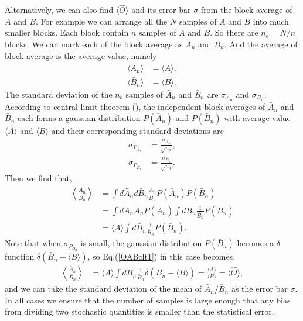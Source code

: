 \documentclass[12pt,letterpaper,UTF8]{report}
\begin{document}
Alternatively, we can also find $\langle \hat{O} \rangle$ and its error bar $\sigma$ from the block average of $A$ and $B$.
For example we can arrange all the $N$ samples of $A$ and $B$ into much smaller blocks. Each block contain $n$ samples of $A$ and $B$. So there are $n_b=N/n$ blocks. We can mark each of the block average as $\bar{A}_n$ and $\bar{B}_n$.
And the average of block average is the average value, namely
\begin{align}
\langle \bar{A}_n \rangle &= \langle A \rangle, \\
\langle \bar{B}_n \rangle &= \langle B \rangle.
\end{align}
The standard deviation of the $n_b$ samples of $\bar{A}_n$ and $\bar{B}_n$ are $\sigma_{A_n}$ and $\sigma_{B_n}$.
According to central limit theorem (\cite{Negele1998Quantum,VesaPDF}), the independent block averages of $\bar{A}_n$ and $\bar{B}_n$ each forms a gaussian distribution $P(\bar{A}_n)$ and $P(\bar{B}_n)$ with average value $\langle A \rangle$ and $\langle B \rangle$ and their corresponding standard deviations are
\begin{align}
\sigma_{P_{\bar{A}_n}} &= \frac{\sigma_{\bar{A}_n}}{\sqrt{n_b}}, \\
\sigma_{P_{\bar{B}_n}} &= \frac{\sigma_{\bar{B}_n}}{\sqrt{n_b}}.
\end{align}
Then we find that,
\begin{align}
\left\langle\frac{\bar{A}_n}{ \bar{B}_n }\right\rangle &=
\int d \bar{A}_n d \bar{B}_n \frac{\bar{A}_n}{\bar{B}_n}
P(\bar{A}_n) P(\bar{B}_n) \nonumber \\
&=
\int d \bar{A}_n \bar{A}_n P(\bar{A}_n)
\int d \bar{B}_n \frac{1}{\bar{B}_n} P(\bar{B}_n) \nonumber \\
&=\langle A   \rangle \int d \bar{B}_n \frac{1}{\bar{B}_n} P(\bar{B}_n).
\label{OABclt1}
\end{align}
Note that when $\sigma_{P_{B_n}}$ is small, the gaussian distribution $P(\bar{B}_n)$ becomes a $\delta$ function $\delta( \bar{B}_n -\langle B \rangle  )$,
so Eq.(\ref{OABclt1}) in this case becomes,
\begin{align}
\left\langle\frac{\bar{A}_n}{ \bar{B}_n }\right\rangle &=
\langle A   \rangle \int d \bar{B}_n \frac{1}{\bar{B}_n} \delta \left( \bar{B}_n -\langle B \rangle  \right)=
\frac{\langle A \rangle}{\langle B \rangle}
=\langle \hat{O} \rangle ,
\label{OABclt2}
\end{align}
and we can take the standard deviation of the mean of ${\bar{A}_n}/{ \bar{B}_n }$ as the error bar $\sigma$. In all cases we ensure that the number of samples is large enough that any bias from dividing two stochastic quantities is smaller than the statistical error.
\end{document}

